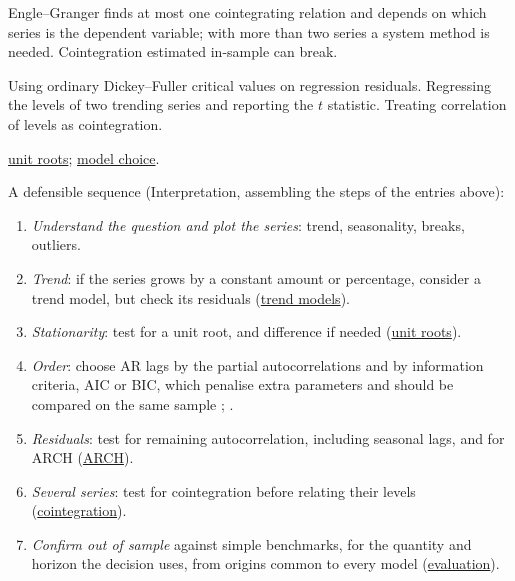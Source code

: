 \begin{qfmethod}
 Engle--Granger finds at most one cointegrating relation and depends on which series is the dependent variable; with more than two series a system method is needed. Cointegration estimated in-sample can break.

 Using ordinary Dickey--Fuller critical values on regression residuals. Regressing the levels of two trending series and reporting the $t$ statistic. Treating correlation of levels as cointegration.

 \hyperref[def:stationarity-unit-roots]{unit roots}; \hyperref[meth:time-series-model-selection]{model choice}.

\end{qfmethod}

\begin{qfmethod}\label{meth:time-series-model-selection}
 A defensible sequence (Interpretation, assembling the steps of the entries above):
\begin{enumerate}
\item \emph{Understand the question and plot the series}: trend, seasonality, breaks, outliers.
\item \emph{Trend}: if the series grows by a constant amount or percentage, consider a trend model, but check its residuals (\hyperref[meth:trend-models]{trend models}).
\item \emph{Stationarity}: test for a unit root, and difference if needed (\hyperref[def:stationarity-unit-roots]{unit roots}).
\item \emph{Order}: choose AR lags by the partial autocorrelations and by information criteria, AIC or BIC, which penalise extra parameters and should be compared on the same sample \citep[pp.~46--47]{s7-tsay}; \citep[sec.~7.5]{s7-hyndman}.
\item \emph{Residuals}: test for remaining autocorrelation, including seasonal lags, and for ARCH (\hyperref[mod:arch-conditional-variance]{ARCH}).
\item \emph{Several series}: test for cointegration before relating their levels (\hyperref[meth:cointegration-testing]{cointegration}).
\item \emph{Confirm out of sample} against simple benchmarks, for the quantity and horizon the decision uses, from origins common to every model (\hyperref[meth:forecast-accuracy-evaluation]{evaluation}).
\end{enumerate}


\end{qfmethod}
